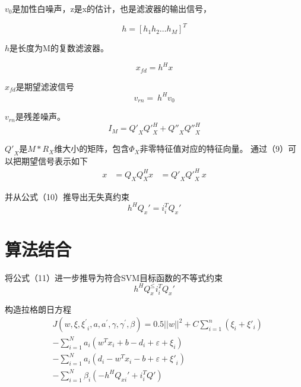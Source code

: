 $v_0$是加性白噪声，z是x的估计，也是滤波器的输出信号，

\begin{equation}
h=\left[h_1h_2\ldots h_M\right]^T
\end{equation}

$h$是长度为M的复数滤波器。

\begin{equation}
x_{fd}= h^Hx
\end{equation}

$x_{fd}$是期望滤波信号
\begin{equation}
v_{rn}=\ h^Hv_0
\end{equation}

$v_{rn}$是残差噪声。
\begin{equation}
I_M={Q'}_X{Q'}_X^H+{Q''}_X{Q''}_X^H
\end{equation}

${Q'}_X$是$M*R_X$维大小的矩阵，包含$\Phi_X$非零特征值对应的特征向量。
通过（9）可以把期望信号表示如下
\begin{equation}
\begin{aligned}
x&=Q_XQ_X^Hx
&={Q'}_X{Q'}_X^H\ x
\end{aligned}
\end{equation}

并从公式（10）推导出无失真约束
\begin{equation}
h^HQ_x'=i_i^TQ_x'
\end{equation}

\section{算法结合}
将公式（11）进一步推导为符合SVM目标函数的不等式约束
\begin{equation}
h^HQ_x^\le i_i^TQ_x'
\end{equation}

构造拉格朗日方程
\begin{equation}
\begin{aligned}
&J\left(w,\xi,{\xi^\prime}_i,a,a^\prime,\gamma,\gamma^\prime,\beta\right)=0.5||w||^2+C\sum\limits_{i=1}^{n}(\xi_i +\xi'_i)\\
&-\sum_{i=1}^{N}{a_i\left(w^Tx_i+b-d_i+\varepsilon+\xi_i\right)}\\
&-\sum_{i=1}^{N}{a_i\left(d_i-w^Tx_i-b+\varepsilon+{\xi'}_i\right)}\\
&-\sum_{i=1}^{N}{\beta_i\left(-h^HQ_{xi}'+i_i^TQ'\right)}
\end{aligned}
\end{equation}

